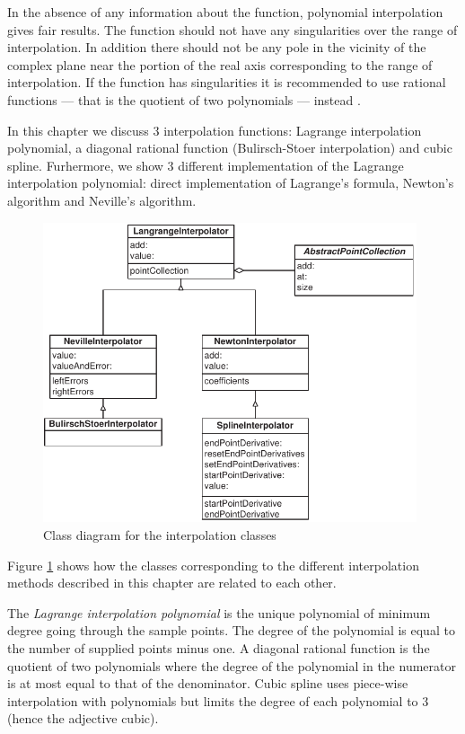 \documentclass[twoside]{book}
\begin{document}
In the absence of any information about the function, polynomial
interpolation gives fair results. The function should not have any
singularities over the range of interpolation. In addition there
should not be any pole in the vicinity of the complex plane near
the portion of the real axis corresponding to the range of
interpolation. If the function has singularities it is recommended
to use rational functions --- that is the quotient of two
polynomials --- instead \cite{Press}.

In this chapter we discuss 3 interpolation functions: Lagrange
interpolation polynomial, a diagonal rational function
(Bulirsch-Stoer interpolation) and cubic spline. Furhermore, we
show 3 different implementation of the Lagrange interpolation
polynomial: direct implementation of Lagrange's formula, Newton's
algorithm and Neville's algorithm.
\begin{figure}
\label{cls:interpolation}
\centering\includegraphics[width=11cm]{Figures/InterpolationClassDiagram}
\caption{Class diagram for the interpolation classes}
\end{figure}
Figure \ref{cls:interpolation} shows how the classes corresponding
to the different interpolation methods described in this chapter
are related to each other.

 The {\it Lagrange interpolation polynomial}
is the unique polynomial of minimum degree going through the
sample points. The degree of the polynomial is equal to the number
of supplied points minus one. A diagonal rational function is the
quotient of two polynomials where the degree of the polynomial in
the numerator is at most equal to that of the denominator. Cubic
spline uses piece-wise interpolation with polynomials but limits
the degree of each polynomial to 3 (hence the adjective cubic).
\end{document}
